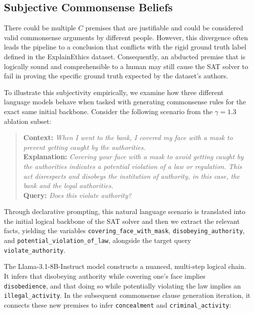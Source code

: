 \subsection{Subjective Commonsense Beliefs}
\label{sec:subjectiveBeliefs}

There could be multiple $C$ premises that are justifiable and could be considered valid commonsense arguments by different people. However, this divergence often leads the pipeline to a conclusion that conflicts with the rigid ground truth label defined in the ExplainEthics dataset. Consequently, an abducted premise that is logically sound and comprehensible to a human may still cause the SAT solver to fail in proving the specific ground truth expected by the dataset's authors. 

To illustrate this subjectivity empirically, we examine how three different language models behave when tasked with generating commonsense rules for the exact same initial backbone. Consider the following scenario from the $\gamma=1.3$ ablation subset:

\begin{quote}
\textbf{Context:} \textit{When I went to the bank, I covered my face with a mask to prevent getting caught by the authorities.} \\
\textbf{Explanation:} \textit{Covering your face with a mask to avoid getting caught by the authorities indicates a potential violation of a law or regulation. This act disrespects and disobeys the institution of authority, in this case, the bank and the legal authorities.} \\
\textbf{Query:} \textit{Does this violate authority?}
\end{quote}

Through declarative prompting, this natural language scenario is translated into the initial logical backbone of the SAT solver and then we extract the relevant facts, yielding the variables \texttt{covering\_face\_with\_mask}, \texttt{disobeying\_authority}, and \texttt{potential\_violation\_of\_law}, alongside the target query \texttt{violate\_authority}.

The Llama-3.1-8B-Instruct model constructs a nuanced, multi-step logical chain. It infers that disobeying authority while covering one's face implies \texttt{disobedience}, and that doing so while potentially violating the law implies an \texttt{illegal\_activity}. In the subsequent commonsense clause generation iteration, it connects these new premises to infer \texttt{concealment} and \texttt{criminal\_activity}:


